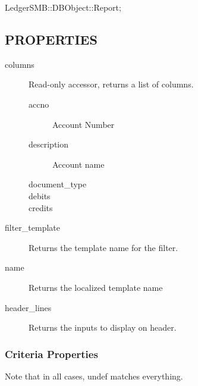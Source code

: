 \begin{description}
\begin{description}
\begin{description}
\begin{description}
\begin{description}
\begin{description}
\begin{description}
\begin{description}
\begin{description}
\begin{description}
\begin{description}
\item[{LedgerSMB::DBObject::Report;}] \mbox{}\end{description}
\subsection*{PROPERTIES\label{LedgerSMB::DBObject::Report::co::Caja_Diaria_PROPERTIES}}
\begin{description}

\item[{columns}] \mbox{}

Read-only accessor, returns a list of columns.

\begin{description}

\item[{accno}] \mbox{}

Account Number


\item[{description}] \mbox{}

Account name


\item[{document\_type}] \mbox{}
\item[{debits}] \mbox{}
\item[{credits}] \mbox{}\end{description}

\item[{filter\_template}] \mbox{}

Returns the template name for the filter.


\item[{name}] \mbox{}

Returns the localized template name


\item[{header\_lines}] \mbox{}

Returns the inputs to display on header.

\end{description}
\subsubsection*{Criteria Properties\label{LedgerSMB::DBObject::Report::co::Caja_Diaria_Criteria_Properties}}


Note that in all cases, undef matches everything.

\begin{description}


\end{description}
\end{description}
\end{description}
\end{description}
\end{description}
\end{description}
\end{description}
\end{description}
\end{description}
\end{description}
\end{description}
